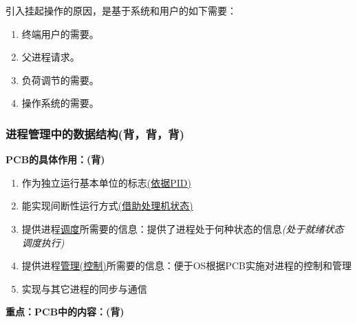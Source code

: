 \documentclass{article}
\begin{document}
引入挂起操作的原因，是基于系统和用户的如下需要：

\begin{enumerate}
    \item 终端用户的需要。
    \item 父进程请求。
    \item 负荷调节的需要。
    \item 操作系统的需要。
\end{enumerate}



\subsubsection{{\color{red}进程管理中的数据结构}{\color{green}(背，背，背)}}
\noindent\textbf{PCB的具体作用：{\color{green}(背)}}
\begin{enumerate}
    \item 作为独立运行基本单位的标志\hyperref[进程标识符]{(依据PID)}
    \item 能实现间断性运行方式\hyperref[处理机状态]{(借助处理机状态)}
    \item 提供进程\hyperref[进程调度信息]{调度}所需要的信息：提供了进程处于何种状态的信息\textit{(处于就绪状态调度执行)}
    \item 提供进程\hyperref[进程控制信息]{管理(控制)}所需要的信息：便于OS根据PCB实施对进程的控制和管理
    \item 实现与其它进程的同步与通信
\end{enumerate}
\textbf{重点：PCB中的内容：{\color{green}(背)}}
\end{document}

